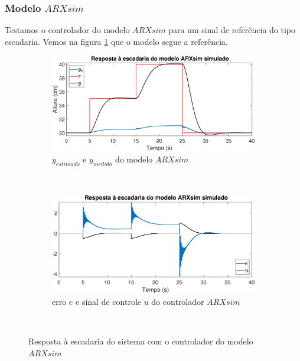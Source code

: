 \subsubsection{Modelo $ARXsim$}

Testamos o controlador do modelo $ARXsim$ para um sinal de referência do tipo escadaria. Vemos na figura \ref{fig:stairsarxsimy} que o modelo segue a referência.

\begin{figure}[htb]
	\centering
	\begin{subfigure}[t]{0.48\textwidth}
		\includegraphics[width=1\linewidth]{pasta1_figuras/stairsarxsimy}
		\caption[$y_{estimado}$ e $y_{medido}$ do modelo $ARX2$]{$y_{estimado}$ e $y_{medido}$ do modelo $ARXsim$}
		\label{fig:stairsarxsimy}
	\end{subfigure}
	~ %
	\begin{subfigure}[t]{0.48\textwidth}
		\includegraphics[width=1\linewidth]{pasta1_figuras/stairsarxsime}
		\caption[erro $e$ e sinal de controle $u$ do controlador $ARX2$]{erro $e$ e sinal de controle $u$ do controlador $ARXsim$}
		\label{fig:stairsarxsime}
	\end{subfigure}
	~ %
	
	\caption{Resposta à escadaria do sistema com o controlador do modelo $ARXsim$}\label{fig:stairsarxsim}
\end{figure}

